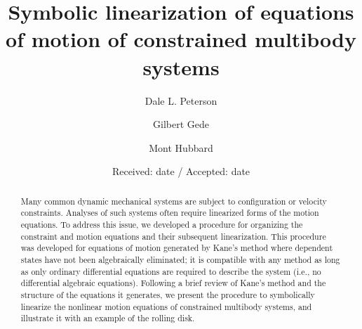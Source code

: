 \documentclass[smallcondensed,final]{svjour3}                     %
\begin{document}
\title{Symbolic linearization of equations of motion of constrained multibody systems}


\author{Dale L. Peterson\and Gilbert Gede\and Mont Hubbard}


\date{Received: date / Accepted: date}

\maketitle

\begin{abstract}
Many common dynamic mechanical systems are subject to configuration or velocity
constraints.
Analyses of such systems often require linearized forms of the motion
equations.
To address this issue, we developed a procedure for organizing the constraint
and motion equations and their subsequent linearization.  This procedure was
developed for equations of motion generated by Kane's method where dependent
states have not been algebraically eliminated; it is compatible with any method
as long as only ordinary differential equations are required to describe the
system (i.e., no differential algebraic equations).
Following a brief review of Kane's method and the structure of the equations it
generates, we present the procedure to symbolically linearize the nonlinear
motion equations of constrained multibody systems, and illustrate it with an
example of the rolling disk.

\end{abstract}
\end{document}
